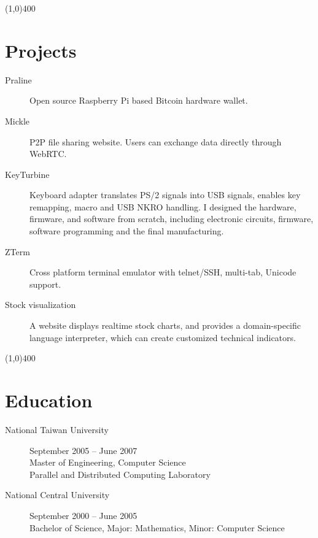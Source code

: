 \documentclass[10pt,a4paper]{article}
\newcommand{\hr}{\noindent\line(1,0){400}}
\newcommand{\br}{\hfill\\}
\newcommand{\CS}{C\nolinebreak\hspace{-.05em}\raisebox{.6ex}{\scriptsize\textbf\#}}
\begin{document}
\hr
\section*{Projects}
\vskip 0.03in
\begin{description}
\item[Praline] Open source Raspberry Pi based Bitcoin hardware wallet.

\item[Mickle] P2P file sharing website. Users can exchange data directly through WebRTC.

\item[KeyTurbine] Keyboard adapter translates PS/2 signals into USB signals, enables key remapping, macro and USB NKRO handling.
I designed the hardware, firmware, and software from scratch, including electronic circuits, firmware, software programming and the final manufacturing.

\item[ZTerm] Cross platform terminal emulator with telnet/SSH, multi-tab, Unicode support.

\item[Stock visualization] A website displays realtime stock charts, and provides a domain-specific language interpreter, which can create customized technical indicators.

\end{description}

\hr
\section*{Education}
\vskip 0.03in
\begin{description}
\item[National Taiwan University]
September 2005 -- June 2007\br
Master of Engineering, Computer Science\br
Parallel and Distributed Computing Laboratory

\item[National Central University]
September 2000 -- June 2005\br
Bachelor of Science, Major: Mathematics, Minor: Computer Science
%
\end{description}
\end{document}
